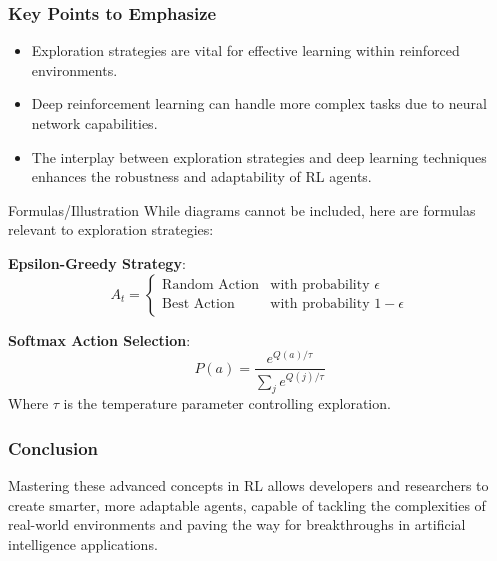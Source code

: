 \documentclass{beamer}
\begin{document}
\begin{frame}[fragile]
    \frametitle{Key Points to Emphasize}
    
    \begin{itemize}
        \item Exploration strategies are vital for effective learning within reinforced environments.
        \item Deep reinforcement learning can handle more complex tasks due to neural network capabilities.
        \item The interplay between exploration strategies and deep learning techniques enhances the robustness and adaptability of RL agents.
    \end{itemize}
    
    \begin{block}{Formulas/Illustration}
    While diagrams cannot be included, here are formulas relevant to exploration strategies:
    
    \textbf{Epsilon-Greedy Strategy}:
    \begin{equation}
    A_t = 
    \begin{cases} 
    \text{Random Action} & \text{with probability } \epsilon \\ 
    \text{Best Action} & \text{with probability } 1 - \epsilon 
    \end{cases}
    \end{equation}
    
    \textbf{Softmax Action Selection}:
    \begin{equation}
    P(a) = \frac{e^{Q(a)/\tau}}{\sum_{j} e^{Q(j)/\tau}}
    \end{equation}
    Where $\tau$ is the temperature parameter controlling exploration.
    \end{block}
\end{frame}

\begin{frame}[fragile]
    \frametitle{Conclusion}
    Mastering these advanced concepts in RL allows developers and researchers to create smarter, more adaptable agents, capable of tackling the complexities of real-world environments and paving the way for breakthroughs in artificial intelligence applications.
\end{frame}
\end{document}
